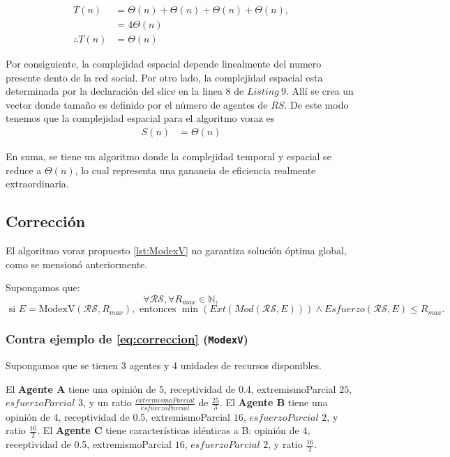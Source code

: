 \documentclass[letterpaper,10pt]{article}
\begin{document}
\begin{align*}
  T(n) &= \Theta(n) + \Theta(n) + \Theta(n) + \Theta(n),\\
  &= 4\Theta(n)\\
  \therefore T(n) &= \Theta(n)
\end{align*}

Por consiguiente, la complejidad espacial depende linealmente del numero presente dento de la red social.
Por otro lado, la complejidad espacial esta determinada por la declaración del slice en la linea 8 de $Listing~9$. Allí se crea un vector donde tamaño es definido por el número de agentes de $RS$. De este modo tenemos que la complejidad espacial para el algoritmo voraz es 
\begin{align*}
  S(n) &= \Theta(n) 
\end{align*}

En suma, se tiene un algoritmo donde la complejidad temporal y espacial se reduce a $\Theta(n)$, lo cual representa una ganancia de eficiencia realmente extraordinaria.
\label{subsec:complejidad_algoritmo_voraz}
\subsection{Corrección}
\label{subsec:correccion_algoritmo_voraz}
El algoritmo voraz propuesto \ref{lst:ModexV} no garantiza solución óptima global, como se mensionó anteriormente. 

Supongamos que:
\[
  \forall \mathcal{R}\mathcal{S}, \forall R_{max} \in \mathbb{N},
\]
\begin{equation}
\text{ si } E = \text{ModexV}(\mathcal{R}\mathcal{S}, R_{max}), \text{ entonces }
\min\left(Ext\left(Mod(\mathcal{R}\mathcal{S}, E)\right)\right) \land Esfuerzo(\mathcal{R}\mathcal{S}, E) \leq R_{max}.
\label{eq:correccion}
\end{equation}

\subsubsection*{Contra ejemplo de \eqref{eq:correccion} (\texttt{ModexV})}

Supongamos que se tienen 3 agentes y 4 unidades de recursos disponibles.

El \textbf{Agente A} tiene una opinión de 5, receptividad de 0.4, extremismoParcial \(25\), $esfuerzoParcial$ \(3\), y un ratio $\frac{extremismoParcial}{esfuerzoParcial}$ de \(\frac{25}{3}\). El \textbf{Agente B} tiene una opinión de 4, receptividad de 0.5, extremismoParcial \(16\), $esfuerzoParcial$ \(2\), y ratio \(\frac{16}{2}\). El \textbf{Agente C} tiene características idénticas a B: opinión de 4, receptividad de 0.5, extremismoParcial \(16\), $esfuerzoParcial$ \(2\), y ratio \(\frac{16}{2}\).
\\
\end{document}
